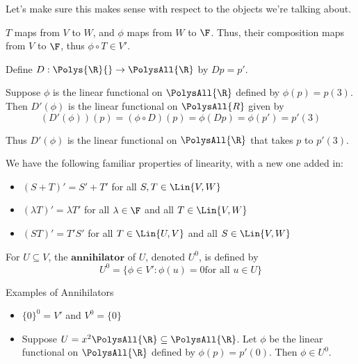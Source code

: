 Let's make sure this makes sense with respect to the objects we're talking about.

$T$ maps from $V$ to $W$, and $\phi$ maps from $W$ to $\F$.
Thus, their composition maps from $V$ to $\F$, thus $\phi \circ T \in V'$.

\begin{example}
   Define $D : \Polys{\R}{\empty} \to \PolysAll{\R}$ by $Dp = p'$.
   
   Suppose $\phi$ is the linear functional on $\PolysAll{\R}$ defined
   by $\phi(p) = p(3)$.
   Then $D'(\phi)$ is the linear functional on $\PolysAll{R}$ given by
   \[ (D'(\phi))(p) = (\phi \circ D)(p) = \phi(Dp) = \phi(p') = p'(3) \]

   Thus $D'(\phi)$ is the linear functional on $\PolysAll{\R}$ that takes
   $p$ to $p'(3)$.
\end{example}

\begin{theorem} 
   We have the following familiar properties of linearity, with a new one added in:
   \begin{itemize}
      \item $(S + T)' = S' + T'$ for all $S, T \in \Lin{V, W}$
      \item $(\lambda T)' = \lambda T'$ for all $\lambda \in \F$ and all $T \in \Lin{V, W}$
      \item $(ST)' = T'S'$ for all $T \in \Lin{U, V}$ and all $S \in \Lin{V, W}$
   \end{itemize}
\end{theorem}

\begin{definition} [Annihilator]
   For $U \subseteq V$, the $\textbf{annihilator}$ of $U$, denoted
   $U^0$, is defined by
   \[ U^0 = \{ \phi \in V' : \phi(u) = 0 \text{for all } u \in U \} \]
\end{definition}

\begin{example} Examples of Annihilators 
   \begin{itemize}
      \item $\{0\}^0 = V'$ and $V^0 = \{0\}$
      \item Suppose $U = x^2 \PolysAll{\R} \subseteq \PolysAll{\R}$. Let
      $\phi$ be the linear functional on $\PolysAll{\R}$ defined by $\phi(p) = p'(0)$.
      Then $\phi \in U^0$.
   \end{itemize}
\end{example}

